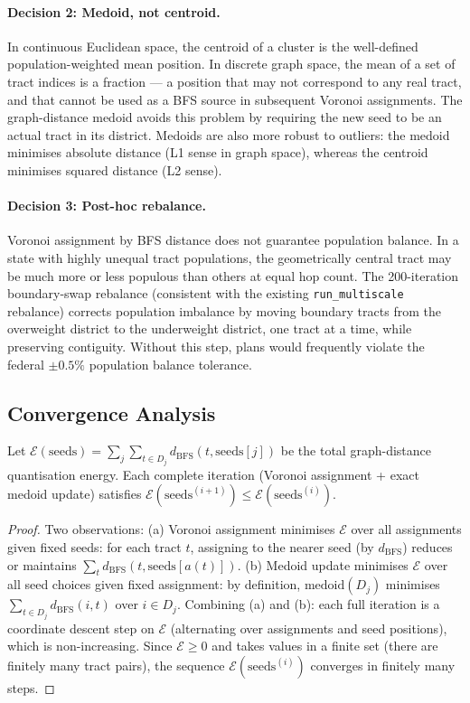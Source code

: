 \paragraph{Decision 2: Medoid, not centroid.}
In continuous Euclidean space, the centroid of a cluster is the well-defined
population-weighted mean position.
In discrete graph space, the mean of a set of tract indices is a fraction
--- a position that may not correspond to any real tract, and that cannot
be used as a BFS source in subsequent Voronoi assignments.
The graph-distance medoid avoids this problem by requiring the new seed to be
an actual tract in its district.
Medoids are also more robust to outliers: the medoid minimises absolute
distance (L1 sense in graph space), whereas the centroid minimises squared
distance (L2 sense).

\paragraph{Decision 3: Post-hoc rebalance.}
Voronoi assignment by BFS distance does not guarantee population balance.
In a state with highly unequal tract populations, the geometrically central
tract may be much more or less populous than others at equal hop count.
The 200-iteration boundary-swap rebalance (consistent with the existing
\texttt{run\_multiscale} rebalance) corrects population imbalance by moving
boundary tracts from the overweight district to the underweight district,
one tract at a time, while preserving contiguity.
Without this step, \cvd{} plans would frequently violate the federal
$\pm 0.5\%$ population balance tolerance.

\subsection{Convergence Analysis}

\begin{proposition}
\label{prop:convergence}
Let $\mathcal{E}(\mathrm{seeds}) = \sum_{j} \sum_{t \in D_j} d_{\mathrm{BFS}}(t, \mathrm{seeds}[j])$
be the total graph-distance quantisation energy.
Each complete iteration (Voronoi assignment + exact medoid update) satisfies
$\mathcal{E}(\mathrm{seeds}^{(i+1)}) \le \mathcal{E}(\mathrm{seeds}^{(i)})$.
\end{proposition}

\begin{proof}
Two observations:
(a) Voronoi assignment minimises $\mathcal{E}$ over all assignments given
    fixed seeds: for each tract $t$, assigning to the nearer seed (by
    $d_{\mathrm{BFS}}$) reduces or maintains $\sum_t d_{\mathrm{BFS}}(t, \mathrm{seeds}[a(t)])$.
(b) Medoid update minimises $\mathcal{E}$ over all seed choices given fixed
    assignment: by definition, $\mathrm{medoid}(D_j)$ minimises
    $\sum_{t \in D_j} d_{\mathrm{BFS}}(i, t)$ over $i \in D_j$.
Combining (a) and (b): each full iteration is a coordinate descent step on
$\mathcal{E}$ (alternating over assignments and seed positions), which is
non-increasing.
Since $\mathcal{E} \ge 0$ and takes values in a finite set (there are finitely
many tract pairs), the sequence $\mathcal{E}(\mathrm{seeds}^{(i)})$ converges
in finitely many steps.
\end{proof}

